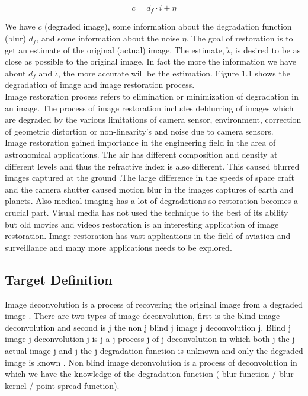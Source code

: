 \documentclass{article}
\begin{document}
\begin{equation}
    c = d_f \cdot i + \eta
\end{equation}

We have $c$ (degraded image), some information about the degradation function (blur) $d_f$, and some information about the noise $\eta$. The goal of restoration is to get an estimate of the original (actual) image. The estimate, $\hat{\iota}$, is desired to be as close as possible to the original image. In fact the more the information we have about $d_f$ and $\hat{\iota}$, the more accurate will be the estimation. Figure 1.1 shows the degradation of image and image restoration process. \\

Image restoration process refers to elimination or minimization of degradation in an image. The process of image restoration includes deblurring of images which are degraded by the various limitations of camera sensor, environment, correction of geometric distortion or non-linearity’s and noise due to camera sensors. \\

Image restoration gained importance in the engineering field in the area of astronomical applications. The air has different composition and density at different levels and thus the refractive index is also different. This caused blurred images captured at the ground \cite{jiang-ming}.The large difference in the speeds of space craft and the camera shutter caused motion blur in the images captures of earth and planets. Also medical imaging has a lot of degradations so restoration becomes a crucial part. Visual media has not used the technique to the best of its ability but old movies and videos restoration is an interesting application of image restoration. Image restoration has vast applications in the field of aviation and surveillance and many more applications needs to be explored.

\subsection{Target Definition}
Image deconvolution is a process of recovering the original image from a degraded image \cite{21}. There are two types of image deconvolution, first is the blind image deconvolution and second is{\color{white} j} the non{\color{white} j} blind{\color{white} j} image{\color{white} j} deconvolution{\color{white} j}. Blind{\color{white} j} image{\color{white} j} deconvolution{\color{white} j} is{\color{white} j} a{\color{white} j} process{\color{white} j} of{\color{white} j} deconvolution in which both{\color{white} j} the{\color{white} j} actual image{\color{white} j} and{\color{white} j} the{\color{white} j} degradation function is unknown and only the degraded image is known \cite{23}. Non blind image deconvolution is a process of deconvolution in which we have the knowledge of the degradation function ( blur function / blur kernel / point spread function).  \\
\end{document}
